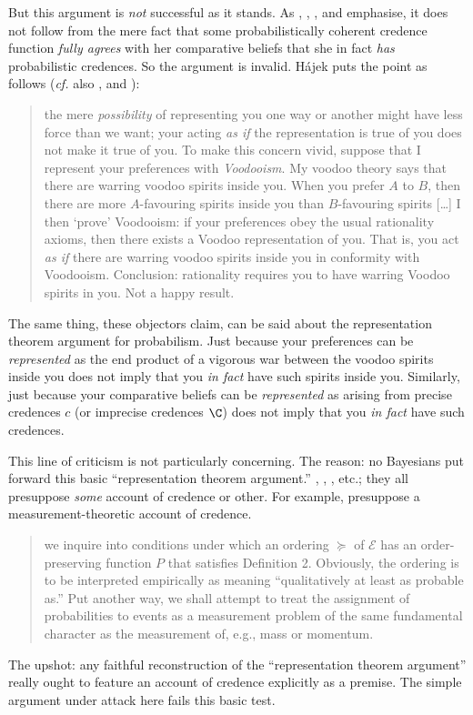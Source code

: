 But this argument is \textit{not} successful as it stands. As \citet{Eriksson2007}, \citet{Hajek2009b}, \citet{Meacham2011}, and \citet{Titelbaum2015} emphasise, it does not follow from the mere fact that some probabilistically coherent credence function \textit{fully agrees} with her comparative beliefs that she in fact \textit{has} probabilistic credences. So the argument is invalid. H\'ajek puts the point as follows (\textit{cf.} also \citealp[p. 14]{Meacham2011}, and \citealp[p. 274]{Titelbaum2015}):
\begin{quote}
the mere \emph{possibility} of representing you one way or another might have less force than we want; your acting \emph{as if} the representation is true of you does not make it true of you. To make this concern vivid, suppose that I represent your preferences with \emph{Voodooism}. My voodoo theory says that there are warring voodoo spirits inside you. When you prefer $A$ to $B$, then there are more $A$-favouring spirits inside you than $B$-favouring spirits [\ldots] I then `prove' Voodooism: if your preferences obey the usual rationality axioms, then there exists a Voodoo representation of you. That is, you act \emph{as if} there are warring voodoo spirits inside you in conformity with Voodooism. Conclusion: rationality requires you to have warring Voodoo spirits in you. Not a happy result. \citep[p. 238]{Hajek2009b}
\end{quote}
The same thing, these objectors claim, can be said about the representation theorem argument for probabilism. Just because your preferences can be \emph{represented} as the end product of a vigorous war between the voodoo spirits inside you does not imply that you \emph{in fact} have such spirits inside you. Similarly, just because your comparative beliefs can be \emph{represented} as arising from precise credences $c$ (or imprecise credences $\C$) does not imply that you \emph{in fact} have such credences.

This line of criticism is not particularly concerning. The reason: no Bayesians put forward this basic ``representation theorem argument.'' \citeauthor{Koopman1940b}, \citeauthor{Savage1954}, \citeauthor{Joyce2010}, etc.; they all presuppose \textit{some} account of credence or other. For example, \citeauthor{Krantz1971} presuppose a measurement-theoretic account of credence. 
\begin{quote}
we inquire into conditions under which an ordering $\succeq$ of $\mathscr{E}$ has an order-preserving function $P$ that satisfies Definition 2. Obviously, the ordering is to be interpreted empirically as meaning ``qualitatively at least as probable as.'' Put another way, we shall attempt to treat the assignment of probabilities to events as a measurement problem of the same fundamental character as the measurement of, e.g., mass or momentum. \citep[pp. 199--202]{Krantz1971} 
\end{quote}
The upshot: any faithful reconstruction of the ``representation theorem argument'' really ought to feature an account of credence explicitly as a premise. The simple argument under attack here fails this basic test.

